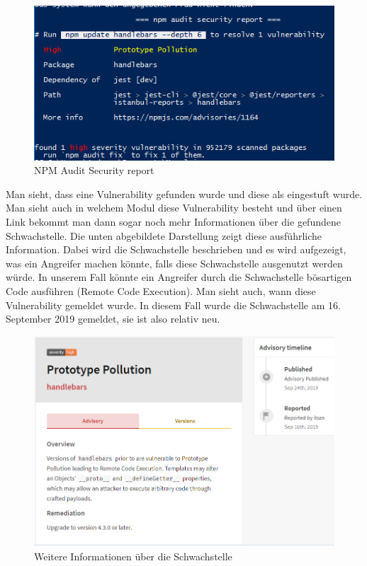 \begin{figure}[H]
    \centering
    \includegraphics[width=\textwidth]{images/npm_audit.PNG}
    \caption{NPM Audit Security report}
    \label{fig:security_report}
\end{figure}

Man sieht, dass eine Vulnerability gefunden wurde und diese als 
eingestuft wurde. Man sieht auch in welchem Modul diese Vulnerability besteht und über einen Link bekommt man dann sogar noch mehr Informationen über die gefundene Schwachstelle. Die unten abgebildete Darstellung zeigt diese ausführliche Information. Dabei wird die Schwachstelle beschrieben und es wird aufgezeigt, was ein Angreifer machen könnte, falls diese Schwachstelle ausgenutzt werden würde. In unserem Fall könnte ein Angreifer durch die Schwachstelle bösartigen Code ausführen (Remote Code Execution). Man sieht auch, wann diese Vulnerability gemeldet wurde. In diesem Fall wurde die Schwachstelle am 16. September 2019 gemeldet, sie ist also relativ neu.


\begin{figure}[H]
    \centering
    \includegraphics[width=\textwidth]{images/vulnerability_info.PNG}
    \caption{Weitere Informationen über die Schwachstelle}
    \label{fig:vulnerability_information}
\end{figure}

